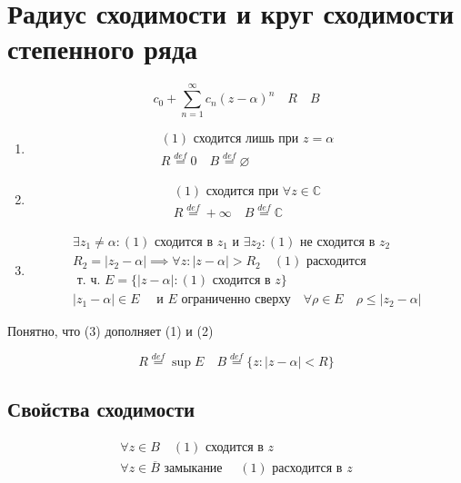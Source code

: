\documentclass[main]{subfiles}
\begin{document}
\section*{Радиус сходимости и круг сходимости степенного ряда}
   \[ c_0 + \sum^\infty_{n=1} c_n(z-\alpha)^n  \quad R \quad B\tag{1} \]
\begin{enumerate}
    \item \begin{gather*}
        (1) \text{ сходится лишь при } z = \alpha \\
        R \stackrel{def}{=} 0 \quad B \stackrel{def}{=} \varnothing
    \end{gather*}
    \item \begin{gather*}
        (1) \text{ сходится при } \forall z \in \mathbb{C} \\
        R \stackrel{def}{=} +\infty \quad B \stackrel{def}{=} \mathbb{C}
    \end{gather*}
    \item \begin{gather*}
        \exists z_1 \ne \alpha : (1) \text{ сходится  в } z_1 \text{ и } \exists z_2 : (1) \text{ не сходится в } z_2 \\
        R_2 = |z_2 - \alpha| \implies \forall z : |z-\alpha| > R_2 \quad (1) \text{ расходится } \\
        \text{ т. ч. } E = \{ |z-\alpha|: (1) \text{ сходится в } z \} \\
        |z_1 - \alpha| \in E \quad \text{ и } E \text{ ограниченно сверху} \quad \forall \rho \in E \quad \rho \leq |z_2 - \alpha|
    \end {gather*}
\end{enumerate}
Понятно, что (3) дополняет (1) и (2)
\begin{definition}
    \[ R \stackrel{def}{=} \sup E \quad B \stackrel{def}{=} \{ z: |z-\alpha| < R \} \]
\end{definition}
\subsection*{Свойства сходимости} 
\begin{theorem}
    \begin{gather*}
        \forall z \in B \quad (1) \text{ сходится в } z \tag{2} \\
        \forall z \in \overline{B} \text{ замыкание } \quad (1) \text{ расходится в } z \tag{3} 
    \end{gather*}
\end{theorem}
\end{document}
